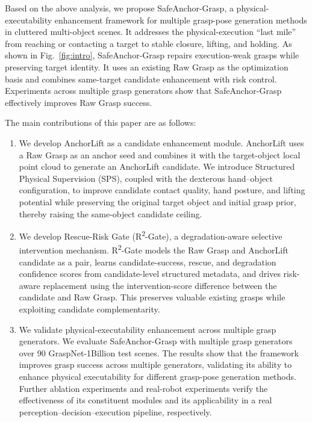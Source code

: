\documentclass[lettersize,journal]{IEEEtran}
\begin{document}
Based on the above analysis, we propose SafeAnchor-Grasp, a physical-executability enhancement framework for multiple grasp-pose generation methods in cluttered multi-object scenes. It addresses the physical-execution ``last mile'' from reaching or contacting a target to stable closure, lifting, and holding. As shown in Fig.~\ref{fig:intro}, SafeAnchor-Grasp repairs execution-weak grasps while preserving target identity. It uses an existing Raw Grasp as the optimization basis and combines same-target candidate enhancement with risk control. Experiments across multiple grasp generators show that SafeAnchor-Grasp effectively improves Raw Grasp success.


The main contributions of this paper are as follows:
\begin{enumerate}
    \item We develop AnchorLift as a candidate enhancement module. AnchorLift uses a Raw Grasp as an anchor seed and combines it with the target-object local point cloud to generate an AnchorLift candidate. We introduce Structured Physical Supervision (SPS), coupled with the dexterous hand--object configuration, to improve candidate contact quality, hand posture, and lifting potential while preserving the original target object and initial grasp prior, thereby raising the same-object candidate ceiling.
    \item We develop Rescue-Risk Gate (R\textsuperscript{2}-Gate), a degradation-aware selective intervention mechanism. R\textsuperscript{2}-Gate models the Raw Grasp and AnchorLift candidate as a pair, learns candidate-success, rescue, and degradation confidence scores from candidate-level structured metadata, and drives risk-aware replacement using the intervention-score difference between the candidate and Raw Grasp. This preserves valuable existing grasps while exploiting candidate complementarity.
    \item We validate physical-executability enhancement across multiple grasp generators. We evaluate SafeAnchor-Grasp with multiple grasp generators over 90 GraspNet-1Billion test scenes. The results show that the framework improves grasp success across multiple generators, validating its ability to enhance physical executability for different grasp-pose generation methods. Further ablation experiments and real-robot experiments verify the effectiveness of its constituent modules and its applicability in a real perception--decision--execution pipeline, respectively.
\end{enumerate}
\end{document}

